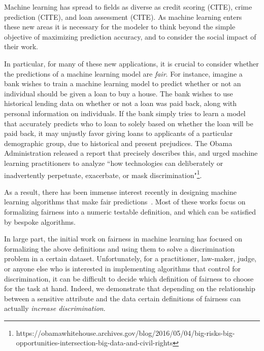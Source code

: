 Machine learning has spread to fields as diverse as credit scoring
(CITE), crime prediction (CITE), and loan assessment (CITE). As
machine learning enters these new areas it is necessary for the
modeler to think beyond the simple objective of maximizing prediction
accuracy, and to consider the social impact of their work.

In particular, for many of these new applications, it is crucial to
consider whether the predictions of a machine learning model are
\emph{fair}. For instance, imagine a bank wishes to train a machine
learning model to predict whether or not an individual should be given
a loan to buy a house. The bank wishes to use historical lending data
on whether or not a loan was paid back, along with personal
information on individuals. If the bank simply tries to learn a model
that accurately predicts who to loan to solely based on whether the
loan will be paid back, it may unjustly favor giving loans to
applicants of a particular demographic group, due to historical and
present prejudices. The Obama Administration released a report that
precisely describes this, and urged machine learning practitioners to
analyze ``how technologies can deliberately or inadvertently
perpetuate, exacerbate, or mask
discrimination"\footnote{https://obamawhitehouse.archives.gov/blog/2016/05/04/big-risks-big-opportunities-intersection-big-data-and-civil-rights}.

As a result, there has been immense interest recently in designing
machine learning algorithms that make fair
predictions~\cite{hardt2016equality,dwork2012fairness,joseph2016rawlsian,kamishima2011fairness,zliobaite2015survey,zafar2016fairness,zafar2015learning,grgiccase,kleinberg2016inherent,calders2010three,kamiran2012data,bolukbasi2016man,kamiran2009classifying,zemel2013learning,louizos2015variational}. Most
of these works focus on formalizing fairness into a numeric testable
definition, and which can be satisfied by bespoke algorithms.

In large part, the initial work on fairness in machine learning has
focused on formalizing the above definitions and using them to solve a
discrimination problem in a certain dataset. Unfortunately, for a
practitioner, law-maker, judge, or anyone else who is interested in
implementing algorithms that control for discrimination, it can be
difficult to decide which definition of fairness to choose for the
task at hand. Indeed, we demonstrate that depending on the
relationship between a sensitive attribute and the data certain
definitions of fairness can actually \emph{increase discrimination}.

